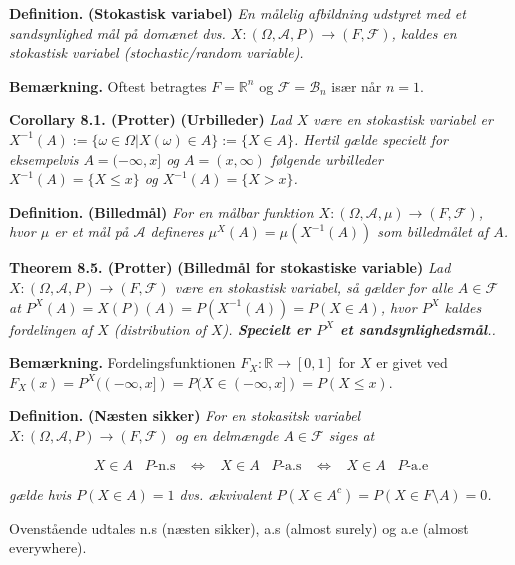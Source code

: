 \documentclass[
]{book}
\begin{document}
\textbf{Definition.} \textbf{(Stokastisk variabel)} \emph{En målelig afbildning udstyret med et sandsynlighed mål på domænet dvs. \(X : (\Omega,\mathcal{A},P) \to (F,\mathcal{F})\), kaldes en stokastisk variabel (stochastic/random variable).}

\textbf{Bemærkning.} Oftest betragtes \(F=\mathbb{R}^n\) og \(\mathcal{F}=\mathcal{B}_n\) især når \(n=1\).

\textbf{Corollary 8.1. (Protter)} \textbf{(Urbilleder)} \emph{Lad \(X\) være en stokastisk variabel er \(X^{-1}(A):=\{\omega\in\Omega \vert X(\omega)\in A\}:=\{X\in A\}\). Hertil gælde specielt for eksempelvis \(A=(-\infty,x]\) og \(A=(x,\infty)\) følgende urbilleder \(X^{-1}(A)=\{X\le x\}\) og \(X^{-1}(A)=\{X> x\}\).}

\textbf{Definition.} \textbf{(Billedmål)} \emph{For en målbar funktion \(X : (\Omega,\mathcal{A},\mu) \to (F,\mathcal{F})\), hvor \(\mu\) er et mål på \(\mathcal{A}\) defineres \(\mu^X(A)=\mu(X^{-1}(A))\) som billedmålet af \(A\).}

\textbf{Theorem 8.5. (Protter)} \textbf{(Billedmål for stokastiske variable)} \emph{Lad \(X : (\Omega,\mathcal{A},P) \to (F,\mathcal{F})\) være en stokastisk variabel, så gælder for alle \(A\in\mathcal{F}\) at \(P^X(A)=X(P)(A)=P(X^{-1}(A))=P(X\in A)\), hvor \(P^X\) kaldes fordelingen af \(X\) (distribution of \(X\)). \textbf{Specielt er \(P^X\) et sandsynlighedsmål}..}

\textbf{Bemærkning.} Fordelingsfunktionen \(F_X: \mathbb{R}\to [0,1]\) for \(X\) er givet ved \(F_X(x)=P^X((-\infty,x])=P(X\in (-\infty,x])=P(X\le x)\).

\textbf{Definition.} \textbf{(Næsten sikker)} \emph{For en stokasitsk variabel \(X:(\Omega,\mathcal{A},P) \to (F,\mathcal{F})\) og en delmængde \(A\in \mathcal{F}\) siges at}

\[
X\in A\hspace{10pt} P\text{-n.s}\hspace{10pt}\Leftrightarrow\hspace{10pt} X\in A\hspace{10pt} P\text{-a.s}\hspace{10pt}\Leftrightarrow\hspace{10pt} X\in A\hspace{10pt} P\text{-a.e}
\]

\emph{gælde hvis \(P(X\in A)=1\) dvs. ækvivalent \(P(X\in A^c)=P(X\in F\setminus A)=0\).}

Ovenstående udtales n.s (næsten sikker), a.s (almost surely) og a.e (almost everywhere).
\end{document}
